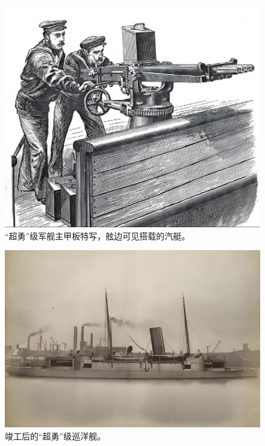 \documentclass[12pt,UTF8]{ctexbook}
\begin{document}
\begin{figure}[htbp]
	\centering
	\includegraphics[width=1\linewidth]{Images/28}
	\caption{“超勇”级军舰主甲板特写，舷边可见搭载的汽艇。}
	\label{fig:1}
\end{figure}

\begin{figure}[htbp]
	\centering
	\includegraphics[width=1\linewidth]{Images/30}
	\caption{竣工后的“超勇”级巡洋舰。}
	\label{fig:1}
\end{figure}
\end{document}
